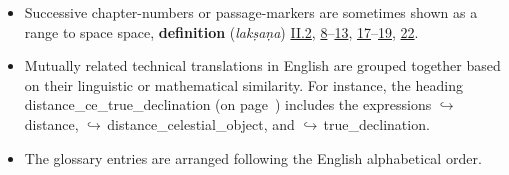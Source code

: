 \begin{itemize}[topsep=0pt]
    \item Successive chapter-numbers or passage-markers are sometimes shown as a range to space space, \eg\enspace \textbf{definition}\quad {} (\textit{lakṣaṇa}) \hyperlink{Sii2}{II.2}, \hyperlink{Sii8}{8}--\hyperlink{Sii13}{13}, \hyperlink{Sii17}{17}--\hyperlink{Sii19}{19}, \hyperlink{Sii22}{22}. 
    \item Mutually related technical translations in English are grouped together based on their linguistic or mathematical similarity. For instance, the heading \gls{distance_ce_true_declination} (on page~\pageref{glsentry-distance_ce_true_declination}) includes the expressions $\hookrightarrow$\,\gls{distance}, $\hookrightarrow$\,\gls{distance_celestial_object}, and 
    $\hookrightarrow$\,\gls{true_declination}. 
    \item The glossary entries are arranged following the English alphabetical order.
\end{itemize}


